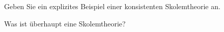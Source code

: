 
\begin{exercise}[144]
Geben Sie ein explizites Beispiel einer konsistenten Skolemtheorie an.
\end{exercise}


\begin{solution}
Was ist überhaupt eine Skolemtheorie?
\end{solution}

